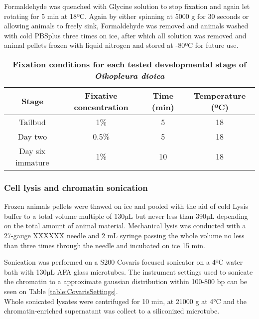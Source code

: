 \documentclass[11pt,twoside,a4paper]{report}
\begin{document}
			Formaldehyde was quenched with Glycine solution to stop fixation and again let rotating for 5 min at 18ºC. 
			Again by either spinning at 5000 g for 30 seconds or allowing animals to freely sink, Formaldehyde was removed and animals washed with cold PBSplus three times on ice, after which all solution was removed and animal pellets frozen with liquid nitrogen and stored at -80ºC for future use.
    
    \begin{table}[!ht]
        \caption{
            \bf{Fixation conditions for each tested developmental stage of \textit{Oikopleura dioica}}
        }
        \begin{center}
            \begin{tabular}{|c|c|c|c|}
                \hline
                Stage & Fixative concentration & Time (min) & Temperature (ºC)\\
                \hline
                Tailbud & 1\% & 5 & 18\\
                Day two & 0.5\% & 5 & 18\\
                Day six immature & 1\% & 10 & 18\\
                \hline
            \end{tabular}
        \end{center}
        \label{table:ODfixation}
    \end{table}
    
    			\subsubsection{Cell lysis and chromatin sonication}
			Frozen animals pellets were thawed on ice and pooled with the aid of cold Lysis buffer to a total volume multiple of 130µL but never less than 390µL depending on the total amount of animal material.		
			Mechanical lysis was conducted with a 27-gauge XXXXXX needle and 2 mL syringe passing the whole volume no less than three times through the needle and incubated on ice 15 min.
			
			Sonication was performed on a S200 Covaris focused sonicator on a 4ºC water bath with 130µL AFA glass microtubes. The instrument settings used to sonicate the chromatin to a approximate gaussian distribution within 100-800 bp can be seen on Table \ref{table:CovarisSettings}. \\
			Whole sonicated lysates were centrifuged for 10 min, at 21000 g at 4°C and the chromatin-enriched supernatant was collect to a siliconized microtube.
			
\end{document}

